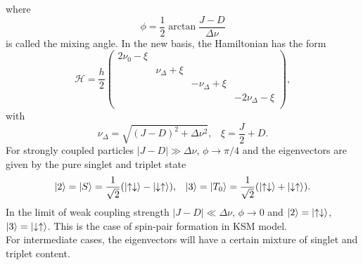 \documentclass[a4paper]{book}
\newcommand{\sss}{\;\;\;} %
\begin{document}
	where
	\begin{equation}
		\phi = \frac{1}{2}\arctan\frac{J-D}{\Delta\nu}
		\label{eq:2_spin-pair_H_mixing_angle}
	\end{equation}
	is called the mixing angle. In the new basis, the Hamiltonian has the form
	\begin{equation}
		\mathcal{H} = \frac{h}{2}
		\left(
		\begin{array}{cccc}
			2\nu_0 - \xi &&&\\
			&\nu_\Delta + \xi&&\\
			&& -\nu_\Delta + \xi&\\
			&&&-2\nu_\Delta-\xi\\
		\end{array}
		\right),
		\label{eq:2_spin-pair_H_matrix_diag}
	\end{equation}
	with
	\begin{equation}
		\nu_\Delta = \sqrt{(J-D)^2 + \Delta\nu^2}, \sss \xi = \frac{J}{2} + D.
		\label{eq:2_spin-pair_H_matrix_diag_2}
	\end{equation}
	For strongly coupled particles $|J - D| \gg \Delta\nu$, $\phi \rightarrow \pi / 4$ and the eigenvectors are given by the pure singlet and triplet state
	\begin{equation}
		\ket 2 = \ket S = \frac{1}{\sqrt{2}}(\ket{\uparrow\downarrow} - \ket{\downarrow\uparrow}), \sss 
		\ket 3 = \ket{T_0} = \frac{1}{\sqrt{2}}(\ket{\uparrow\downarrow} + \ket{\downarrow\uparrow}).
		\label{eq:2_spin-pair_H_pure_S_and_T0}
	\end{equation}
	In the limit of weak coupling strength $|J - D| \ll \Delta\nu$, $\phi \rightarrow 0$ and $\ket{2} = \ket{\uparrow\downarrow}$, $\ket 3 = \ket{\downarrow\uparrow}$. This is the case of spin-pair formation in KSM model.\\
	For intermediate cases, the eigenvectors will have a certain mixture of singlet and triplet content.\\
	
\end{document}
